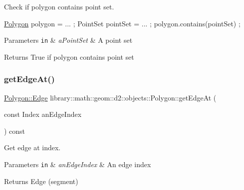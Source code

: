 Check if polygon contains point set. 


\begin{DoxyCode}
\hyperlink{classlibrary_1_1math_1_1geom_1_1d2_1_1objects_1_1_polygon_ad2a0b0bcd5301dbcd9e2fa101fbd220b}{Polygon} polygon = ... ;
PointSet pointSet = ... ;
polygon.contains(pointSet) ;
\end{DoxyCode}



\begin{DoxyParams}[1]{Parameters}
\mbox{\tt in}  & {\em a\+Point\+Set} & A point set \\
\hline
\end{DoxyParams}
\begin{DoxyReturn}{Returns}
True if polygon contains point set 
\end{DoxyReturn}
\mbox{\label{classlibrary_1_1math_1_1geom_1_1d2_1_1objects_1_1_polygon_a92d93fe3b0f2d2b17b393475f3e1c090}} 
\subsubsection{\texorpdfstring{get\+Edge\+At()}{getEdgeAt()}}
{\footnotesize\ttfamily \hyperlink{classlibrary_1_1math_1_1geom_1_1d2_1_1objects_1_1_polygon_a17e3083d71685e16f3244298e6f44ad9}{Polygon\+::\+Edge} library\+::math\+::geom\+::d2\+::objects\+::\+Polygon\+::get\+Edge\+At (\begin{DoxyParamCaption}\item[{const Index}]{an\+Edge\+Index }\end{DoxyParamCaption}) const}



Get edge at index. 


\begin{DoxyParams}[1]{Parameters}
\mbox{\tt in}  & {\em an\+Edge\+Index} & An edge index \\
\hline
\end{DoxyParams}
\begin{DoxyReturn}{Returns}
Edge (segment) 
\end{DoxyReturn}
\mbox{\label{classlibrary_1_1math_1_1geom_1_1d2_1_1objects_1_1_polygon_ac01b8f978e663f09ef0f7a91de7720ce}} 
